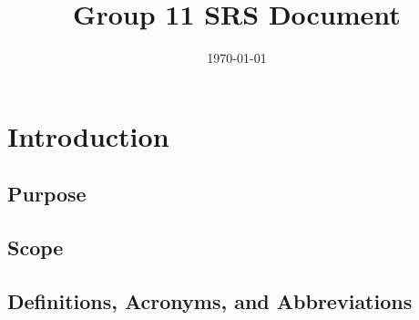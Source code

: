\documentclass[12pt, titlepage]{article}
\title{Group 11 SRS Document}
\author{}
\date{\today}
\begin{document}
\maketitle

\tableofcontents
\listoftables
\listoffigures

\newpage


\section{Introduction}

  \subsection{Purpose}
  \subsection{Scope}
  \subsection{Definitions, Acronyms, and Abbreviations}
\end{document}
